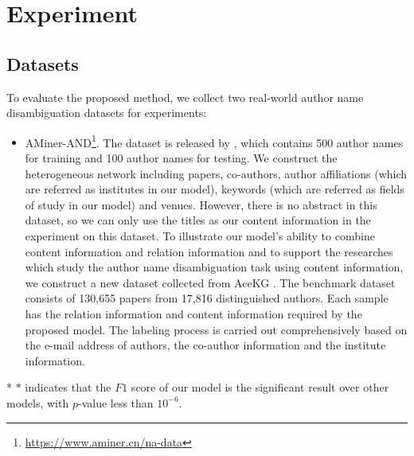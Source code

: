 \documentclass[letterpaper]{article}
\begin{document}
\section{Experiment}
\subsection{Datasets}
To evaluate the proposed method, we collect two real-world author name disambiguation datasets for experiments:
\begin{itemize}
\item AMiner-AND\footnote{\small \url{https://www.aminer.cn/na-data}}.
The dataset is released by \cite{JieTang}, which contains 500 author names for training and 100 author names for testing. We construct the heterogeneous network including papers, co-authors, author affiliations (which are referred as institutes in our model), keywords (which are referred as fields of study in our model) and venues. However, there is no abstract in this dataset, so we can only use the titles as our content information in the experiment on this dataset.
To illustrate our model's ability to combine content information and relation information and to support the researches which study the author name disambiguation task using content information, we construct a new dataset collected from AceKG \cite{AceKG}. The benchmark dataset consists of 130,655 papers from 17,816 distinguished authors. Each sample has the relation information and content information required by the proposed model. The labeling process is carried out comprehensively based on the e-mail address of authors, the co-author information and the institute information.
\end{itemize}

\begin{table}[t]
\begin{center}
\caption{Results of author name disambiguation.}
\label{tb:allresult}
\footnotesize
{}
\begin{tablenotes}
\small \item[*] $*$ indicates that the $F1$ score of our model is the significant result over other models, with $p$-value less than $10^{-6}$.
\end{tablenotes}
\end{center}
\end{table}
\end{document}
